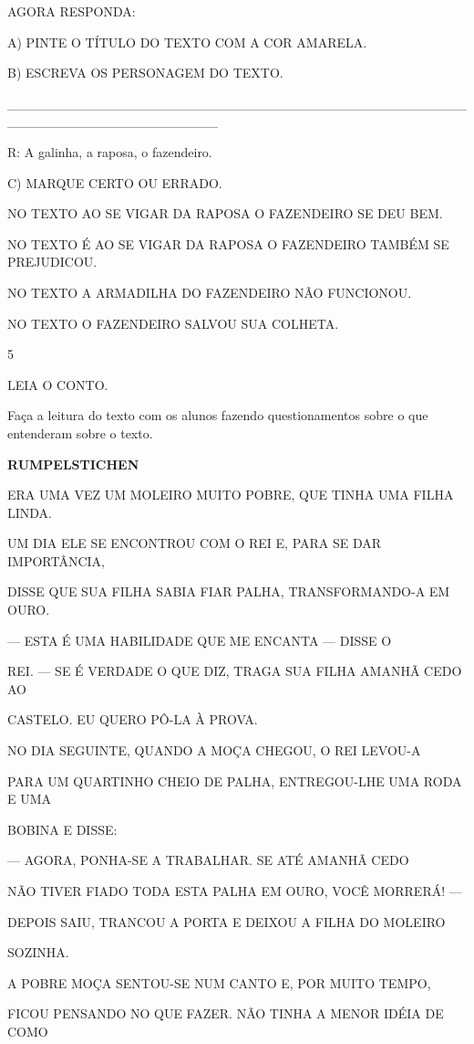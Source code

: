 {{{{{AGORA RESPONDA:

A) PINTE O TÍTULO DO TEXTO COM A COR AMARELA.

B) ESCREVA OS PERSONAGEM DO TEXTO.

\_\_\_\_\_\_\_\_\_\_\_\_\_\_\_\_\_\_\_\_\_\_\_\_\_\_\_\_\_\_\_\_\_\_\_\_\_\_\_\_\_\_\_\_\_\_\_\_\_\_\_\_\_\_\_\_\_\_\_\_\_\_\_\_\_\_\_\_\_\_

R: A galinha, a raposa, o fazendeiro.

C) MARQUE CERTO OU ERRADO.

NO TEXTO AO SE VIGAR DA RAPOSA O FAZENDEIRO SE DEU BEM.

NO TEXTO É AO SE VIGAR DA RAPOSA O FAZENDEIRO TAMBÉM SE PREJUDICOU.

NO TEXTO A ARMADILHA DO FAZENDEIRO NÃO FUNCIONOU.

NO TEXTO O FAZENDEIRO SALVOU SUA COLHETA.

\num{5}

LEIA O CONTO.

Faça a leitura do texto com os alunos fazendo questionamentos sobre o
que entenderam sobre o texto.

\textbf{RUMPELSTICHEN}

ERA UMA VEZ UM MOLEIRO MUITO POBRE, QUE TINHA UMA FILHA LINDA.

UM DIA ELE SE ENCONTROU COM O REI E, PARA SE DAR IMPORTÂNCIA,

DISSE QUE SUA FILHA SABIA FIAR PALHA, TRANSFORMANDO-A EM OURO.

--- ESTA É UMA HABILIDADE QUE ME ENCANTA --- DISSE O

REI. --- SE É VERDADE O QUE DIZ, TRAGA SUA FILHA AMANHÃ CEDO AO

CASTELO. EU QUERO PÔ-LA À PROVA.

NO DIA SEGUINTE, QUANDO A MOÇA CHEGOU, O REI LEVOU-A

PARA UM QUARTINHO CHEIO DE PALHA, ENTREGOU-LHE UMA RODA E UMA

BOBINA E DISSE:

--- AGORA, PONHA-SE A TRABALHAR. SE ATÉ AMANHÃ CEDO

NÃO TIVER FIADO TODA ESTA PALHA EM OURO, VOCÊ MORRERÁ! ---

DEPOIS SAIU, TRANCOU A PORTA E DEIXOU A FILHA DO MOLEIRO

SOZINHA.

A POBRE MOÇA SENTOU-SE NUM CANTO E, POR MUITO TEMPO,

FICOU PENSANDO NO QUE FAZER. NÃO TINHA A MENOR IDÉIA DE COMO

}}}}}
